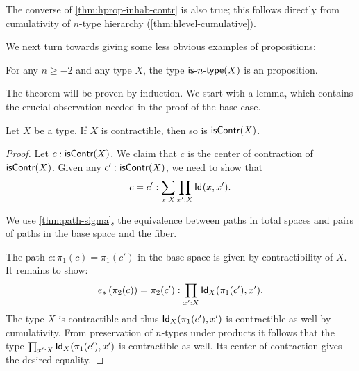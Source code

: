\begin{rmk}\label{rem:is-contr-implies-isaprop-and-element}
 The converse of \autoref{thm:hprop-inhab-contr} is also true; this follows directly from cumulativity of $n$-type hierarchy (\autoref{thm:hlevel-cumulative}).
\end{rmk}

We next turn towards giving some less obvious examples of propositions:

\begin{thm}\label{thm:isaprop-isofhlevel}
 For any $n \geq -2$ and any type $X$, the type $\istype{n}(X)$ is an proposition.
\end{thm}

The theorem will be proven by induction. We start with a lemma, which contains the crucial observation needed in the proof of the base case.

\begin{lem}\label{lem:contr-contr-is-contr}
  Let $X$ be a type. If $X$ is contractible, then so is $\iscontr(X)$.
\end{lem}

\begin{proof}
 Let $c : \iscontr(X)$. We claim that $c$ is the center of contraction of $\iscontr (X)$.
  Given any $c' : \iscontr (X)$, we need to show that
       \[ c = c' : \sum_{x:X}\prod_{x':X}\idtype{x}{x'}  . \]

 We use \autoref{thm:path-sigma}, the equivalence between paths in total spaces and pairs of paths in the base space and the fiber.

 The path $e : \pi_1(c) = \pi_1 (c')$ in the base space is given by contractibility of $X$.
 It remains to show:
 \[ \trans{e}{\pi_2(c)} = \pi_2 (c') : \prod_{x' : X} \idtype[X]{\pi_1 (c')} {x'}  .  \]
 The type $X$ is contractible and thus $\idtype[X]{\pi_1 (c')} {x'}$ is contractible as well by cumulativity.
From preservation of $n$-types under products it follows that the type $\prod_{x' : X} \idtype[X]{\pi_1 (c')} {x'}$
  is contractible as well. Its center of contraction gives the desired equality.
\end{proof}

